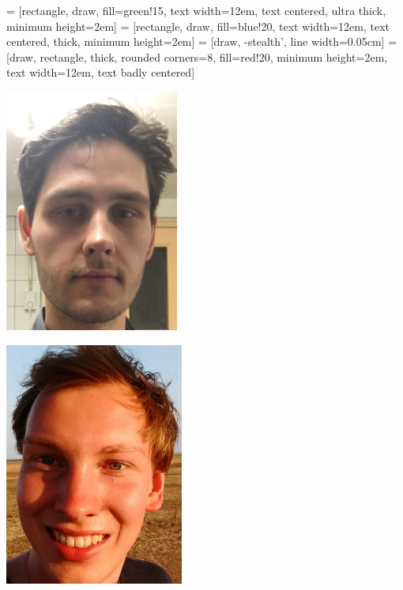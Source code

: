 \newpage
\thispagestyle{empty}

 = [rectangle, draw, fill=green!15, 
    text width=12em, text centered, ultra thick, minimum height=2em]
 = [rectangle, draw, fill=blue!20, 
    text width=12em, text centered, thick, minimum height=2em]
 = [draw, -stealth', line width=0.05cm]
 = [draw, rectangle, thick, rounded corners=8, fill=red!20, minimum height=2em, text width=12em, text badly centered]

\mbox{}
\vfill
\begin{minipage}[c]{.45\textwidth}
\centering
  \includegraphics[height=80mm,center]{img/Frits.png}
\end{minipage}%
\hfill
\begin{minipage}[c]{.45\textwidth}
  \centering
  \includegraphics[height=80mm,center]{img/Willem.png}
\end{minipage}
\vfill
